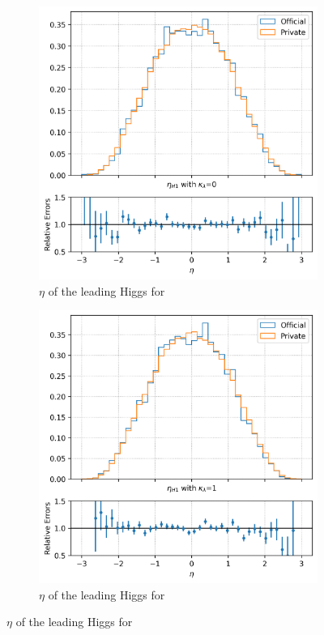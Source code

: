 \begin{figure}[h!]
    \centering
    \begin{subfigure}[b]{0.4\textwidth}
        \centering
        \includegraphics[width=\textwidth]{Images/4.HH4b Analysis/Validation plots/eta 0.png}
        \caption{$\eta$ of the leading Higgs for }
        \label{fig: kl0}
    \end{subfigure}
    \hfill
    \begin{subfigure}[b]{0.4\textwidth}
        \centering
        \includegraphics[width=\textwidth]{Images/4.HH4b Analysis/Validation plots/eta 1.png}
        \caption{$\eta$ of the leading Higgs for }
        \label{fig: kl1}
    \end{subfigure}


\end{figure}
